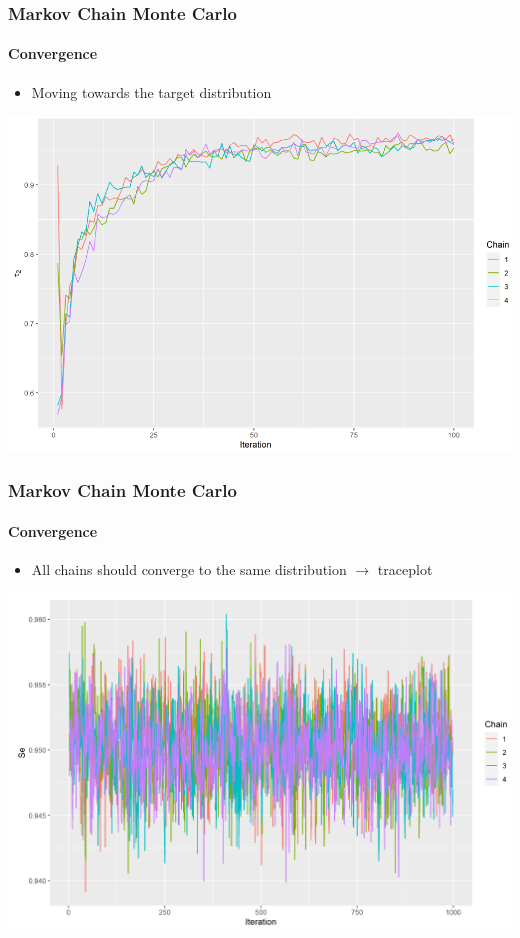 \documentclass{beamer}
\begin{document}
\begin{frame}
\frametitle{Markov Chain Monte Carlo}
\framesubtitle{Convergence}
\begin{itemize}
 \item{Moving towards the target distribution}
\end{itemize}
\includegraphics[width=\textwidth]{imgs/convergence.png}
\end{frame}

\begin{frame}
\frametitle{Markov Chain Monte Carlo}
\framesubtitle{Convergence}
\begin{itemize}
 \item{All chains should converge to the same distribution $\rightarrow$ traceplot}
\end{itemize}
\includegraphics[width=\textwidth]{imgs/traceplot.png}
\end{frame}
\end{document}
